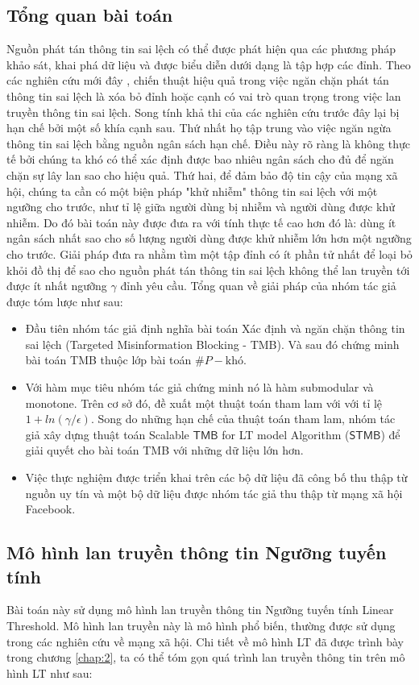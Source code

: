 \subsection{Tổng quan bài toán}
Nguồn phát tán thông tin sai lệch có thể được phát hiện qua các phương pháp khảo sát, khai phá dữ liệu \cite{qazvin, kwon} và được biểu diễn dưới dạng là tập hợp các đỉnh. Theo các nghiên cứu mới đây \cite{khali, tong, pra}, chiến thuật hiệu quả trong việc ngăn chặn phát tán thông tin sai lệch là xóa bỏ đỉnh hoặc cạnh có vai trò quan trọng trong việc lan truyền thông tin sai lệch. Song tính khả thi của các nghiên cứu trước đây lại bị hạn chế bởi một số khía cạnh sau. Thứ nhất họ tập trung vào việc ngăn ngừa thông tin sai lệch bằng nguồn ngân sách hạn chế. Điều này rõ ràng là không thực tế bởi chúng ta khó có thể xác định được bao nhiêu ngân sách cho đủ để ngăn chặn sự lây lan sao cho hiệu quả. Thứ hai, để đảm bảo độ tin cậy của mạng xã hội, chúng ta cần có một biện pháp "khử nhiễm" thông tin sai lệch với một ngưỡng cho trước, như tỉ lệ giữa người dùng bị nhiễm và người dùng được khử nhiễm. Do đó bài toán này được đưa ra với tính thực tế cao hơn đó là: dùng ít ngân sách nhất sao cho số lượng người dùng được khử nhiễm lớn hơn một ngưỡng cho trước. Giải pháp đưa ra nhằm tìm một tập đỉnh có ít phần tử nhất để loại bỏ khỏi đồ thị để sao cho nguồn phát tán thông tin sai lệch không thể lan truyền tới được ít nhất ngưỡng $\gamma$ đỉnh yêu cầu. Tổng quan về giải pháp của nhóm tác giả được tóm lược như sau:
\begin{itemize}
	\item Đầu tiên nhóm tác giả định nghĩa bài toán Xác định và ngăn chặn thông tin sai lệch (Targeted Misinformation Blocking - TMB). Và sau đó chứng minh bài toán TMB thuộc lớp bài toán $\#P-\text{khó}$.
	\item Với hàm mục tiêu nhóm tác giả chứng minh nó là hàm submodular và monotone. Trên cơ sở đó, đề xuất một thuật toán tham lam với với tỉ lệ $1+ln(\gamma/\epsilon)$. Song do những hạn chế của thuật toán tham lam, nhóm tác giả xây dựng thuật toán Scalable $\mathsf{TMB}$ for LT model Algorithm ($\mathsf{STMB}$) để giải quyết cho bài toán TMB với những dữ liệu lớn hơn. 
	\item Việc thực nghiệm được triển khai trên các bộ dữ liệu đã công bố thu thập từ nguồn uy tín và một bộ dữ liệu được nhóm tác giả thu thập từ mạng xã hội Facebook. 
\end{itemize}

\subsection{Mô hình lan truyền thông tin Ngưỡng tuyến tính}
Bài toán này sử dụng mô hình lan truyền thông tin Ngưỡng tuyến tính Linear Threshold. Mô hình lan truyền này là mô hình phổ biến, thường được sử dụng trong các nghiên cứu về mạng xã hội. Chi tiết về mô hình LT đã được trình bày trong chương \ref{chap:2}, ta có thể tóm gọn quá trình lan truyền thông tin trên mô hình LT như sau:

